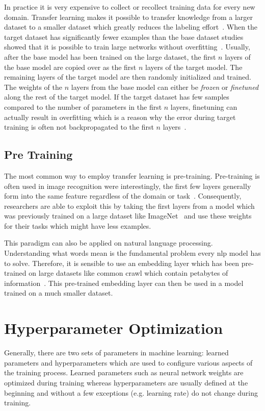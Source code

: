 In practice it is very expensive to collect or recollect training data for every new domain. Transfer learning makes it possible to transfer knowledge from a larger dataset to a smaller dataset which greatly reduces the labeling effort~\cite{Blitzer2007}. When the target dataset has significantly fewer examples than the base dataset studies showed that it is possible to train large networks without overfitting~\cite{Donahue2013}\cite{Zeiler2014}. Usually, after the base model has been trained on the large dataset, the first $n$ layers of the base model are copied over as the first $n$ layers of the target model. The remaining layers of the target model are then randomly initialized and trained. The weights of the $n$ layers from the base model can either be \textit{frozen} or \textit{finetuned} along the rest of the target model. If the target dataset has few samples compared to the number of parameters in the first $n$ layers, finetuning can actually result in overfitting which is a reason why the error during target training is often not backpropagated to the first $n$ layers~\cite{Yosinski2014}.

\subsection*{Pre Training}
The most common way to employ transfer learning is pre-training. 
Pre-training is often used in image recognition were interestingly, the first few layers generally form into the same feature regardless of the domain or task~\cite{Yosinski2014}. Consequently, researchers are able to exploit this by taking the first layers from a model which was previously trained on a large dataset like ImageNet~\cite{Russakovsky2015} and use these weights for their tasks which might have less examples.

This paradigm can also be applied on natural language processing. Understanding what words mean is the fundamental problem every \gls{nlp} model has to solve. Therefore, it is sensible to use an embedding layer which has been pre-trained on large datasets like common crawl which contain petabytes of information~\cite{commonCrawl}. This pre-trained embedding layer can then be used in a model trained on a much smaller dataset.
 
\section{Hyperparameter Optimization}

Generally, there are two sets of parameters in machine learning: learned parameters and hyperparameters which are used to configure various aspects of the training process. Learned parameters such as neural network weights are optimized during training whereas hyperparameters are usually defined at the beginning and without a few exceptions {(e.g. learning rate)} do not change during training.

